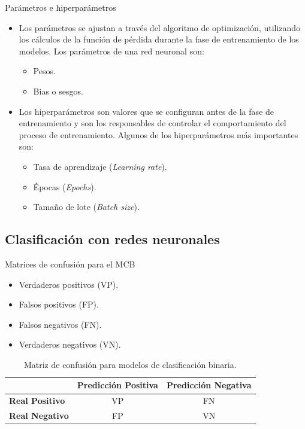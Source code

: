 \begin{frame}{Parámetros e hiperparámetros}

\begin{itemize}

	\item Los parámetros se ajustan a través del algoritmo de optimización, utilizando los cálculos de la función de pérdida durante la fase de entrenamiento de los modelos. Los parámetros de una red neuronal son:
\begin{itemize}
	\item Pesos.
	\item Bias o sesgos.
\end{itemize}
	
	\item Los hiperparámetros son valores que se configuran antes de la fase de entrenamiento y son los responsables de controlar el comportamiento del proceso de entrenamiento. Algunos de los hiperparámetros más importantes son:
\begin{itemize}
	\item Tasa de aprendizaje (\textit{Learning rate}).
	\item Épocas (\textit{Epochs}).
	\item Tamaño de lote (\textit{Batch size}).
\end{itemize}

\end{itemize}
\end{frame}


\subsection{Clasificación con redes neuronales}
\begin{frame}{Matrices de confusión para el MCB}
\begin{itemize}
	\item \small Verdaderos positivos (VP).
    \item \small Falsos positivos (FP).
    \item \small Falsos negativos (FN).
    \item \small Verdaderos negativos (VN).
\end{itemize}

\begin{table}[H]
\centering
\begin{tabular}{|l|c|c|}
\hline
 & \textbf{Predicción Positiva} & \textbf{Predicción Negativa} \\ \hline
\textbf{Real Positivo} & VP & FN \\ \hline
\textbf{Real Negativo} & FP & VN \\ \hline
\end{tabular}
\caption{Matriz de confusión para modelos de clasificación binaria.}
\label{tab:confusion_matrix}
\end{table}
\end{frame}

